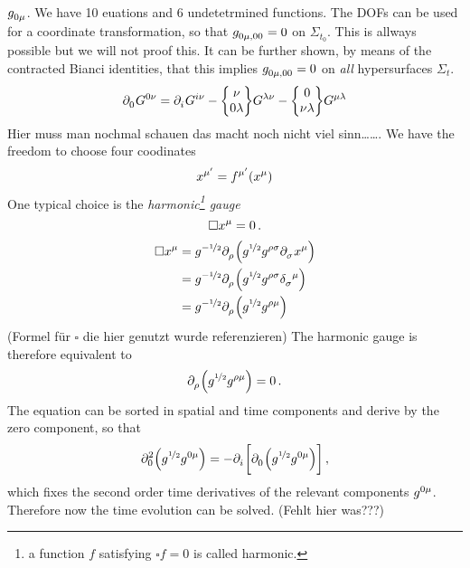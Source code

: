 $\tensor{g}{_0_\mu}$. We have 10 euations and 6 undetetrmined functions. The
DOFs can be used for a coordinate transformation, so that
$\tensor{g}{_0_\mu_{,00}}=0$ on $\Sigma_{t_0}$. This is allways possible but we
will not proof this. It can be further shown, by means of the contracted Bianci
identities, that this implies $\tensor{g}{_0_\mu_{,00}}=0$ on \emph{all}
hypersurfaces $\Sigma_{t}$.
\begin{equation}
\tensor{\partial}{_0}\tensor{G}{^0^\nu}=
\tensor{\partial}{_i}\tensor{G}{^i^\nu}
-\cSym{\nu}{0}{\lambda}\tensor{G}{^\lambda^\nu}
-\cSym{0}{\nu}{\lambda}\tensor{G}{^\mu^\lambda}
\end{equation}
Hier muss man nochmal schauen das macht noch nicht viel sinn\ldots\ldots.
We have the freedom to choose four coodinates
\begin{equation}
\tensor{x}{^{\mu^\prime}}=\tensor{f}{^{\mu^\prime}}\left(\tensor{x}{^\mu}\right)
\end{equation}
One typical choice is the \emph{harmonic\footnote{a function $f$ satisfying
$\square f = 0$ is called harmonic.} gauge}
\begin{equation}
\square\tensor{x}{^\mu}=0\,.
\end{equation}
\begin{equation}
\begin{split}
\square\tensor{x}{^\mu}&=g^{-\nicefrac{1}{2}}\tensor{\partial}{_\rho}\left(g^{\nicefrac{1}{2}}\tensor{g}{^\rho^\sigma}\tensor{\partial}{_\sigma}\tensor{x}{^\mu}\right)\\
&=g^{-\nicefrac{1}{2}}\tensor{\partial}{_\rho}\left(g^{\nicefrac{1}{2}}\tensor{g}{^\rho^\sigma}\tensor{\delta}{_\sigma^\mu}\right)\\
&=g^{-\nicefrac{1}{2}}\tensor{\partial}{_\rho}\left(g^{\nicefrac{1}{2}}\tensor{g}{^\rho^\mu}\right)\\
\end{split}
\end{equation}
(Formel für $\square$ die hier genutzt wurde referenzieren)
The harmonic gauge is therefore equivalent to
\begin{equation}
\tensor{\partial}{_\rho}\left(g^{\nicefrac{1}{2}}\tensor{g}{^\rho^\mu}\right)=0\,
.\\
\end{equation}
The equation can be sorted in spatial and time components and derive by the
zero component, so that
\begin{equation}
\tensor*{\partial}{*_0^2}\left(g^{\nicefrac{1}{2}}\tensor{g}{^0^\mu}\right)
=
-\tensor{\partial}{_i}\left[\tensor{\partial}{_0}\left(g^{\nicefrac{1}{2}}\tensor{g}{^0^\mu}\right)\right]\,
,\end{equation}
which fixes the second order time derivatives of the relevant components
$\tensor{g}{^0^\mu}$. Therefore now the time evolution can be solved. (Fehlt
hier was???)
